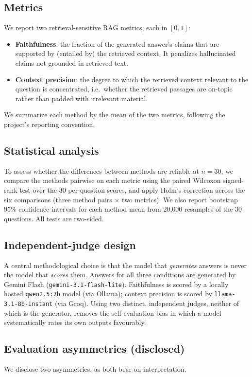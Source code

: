 \documentclass[conference]{IEEEtran}
\begin{document}
\subsection{Metrics}
We report two retrieval-sensitive RAG metrics, each in $[0,1]$:
\begin{itemize}
  \item \textbf{Faithfulness}: the fraction of the generated answer's claims that
        are supported by (entailed by) the retrieved context. It penalizes
        hallucinated claims not grounded in retrieved text.
  \item \textbf{Context precision}: the degree to which the retrieved context
        relevant to the question is concentrated, i.e.\ whether the retrieved
        passages are on-topic rather than padded with irrelevant material.
\end{itemize}
We summarize each method by the mean of the two metrics, following the project's
reporting convention.

\subsection{Statistical analysis}
To assess whether the differences between methods are reliable at $n=30$, we
compare the methods pairwise on each metric using the paired Wilcoxon
signed-rank test over the 30 per-question scores, and apply Holm's correction
across the six comparisons (three method pairs $\times$ two metrics). We also
report bootstrap 95\% confidence intervals for each method mean from 20{,}000
resamples of the 30 questions. All tests are two-sided.

\subsection{Independent-judge design}
A central methodological choice is that the model that \emph{generates} answers
is never the model that \emph{scores} them. Answers for all three conditions are
generated by Gemini Flash (\texttt{gemini-3.1-flash-lite}). Faithfulness is
scored by a locally hosted \texttt{qwen2.5:7b} model (via Ollama); context
precision is scored by \texttt{llama-3.1-8b-instant} (via Groq). Using two
distinct, independent judges, neither of which is the generator, removes the
self-evaluation bias in which a model systematically rates its own outputs
favourably.

\subsection{Evaluation asymmetries (disclosed)}
We disclose two asymmetries, as both bear on interpretation.
\end{document}
